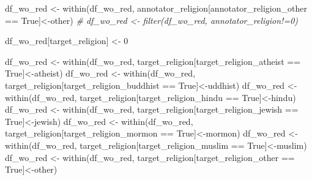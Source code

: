\documentclass[
]{article}
\newenvironment{Shaded}{\begin{snugshade}}{\end{snugshade}}
\newcommand{\CommentTok}[1]{\textcolor[rgb]{0.56,0.35,0.01}{\textit{#1}}}
\newcommand{\DecValTok}[1]{\textcolor[rgb]{0.00,0.00,0.81}{#1}}
\newcommand{\FunctionTok}[1]{\textcolor[rgb]{0.00,0.00,0.00}{#1}}
\newcommand{\NormalTok}[1]{#1}
\newcommand{\OtherTok}[1]{\textcolor[rgb]{0.56,0.35,0.01}{#1}}
\newcommand{\SpecialCharTok}[1]{\textcolor[rgb]{0.00,0.00,0.00}{#1}}
\newcommand{\StringTok}[1]{\textcolor[rgb]{0.31,0.60,0.02}{#1}}
\begin{document}
\begin{Shaded}
\begin{Highlighting}[]
\NormalTok{df\_wo\_red }\OtherTok{\textless{}{-}} \FunctionTok{within}\NormalTok{(df\_wo\_red, annotator\_religion[annotator\_religion\_other }\SpecialCharTok{==} \StringTok{\textquotesingle{}True\textquotesingle{}}\NormalTok{]}\OtherTok{\textless{}{-}}\StringTok{\textquotesingle{}other\textquotesingle{}}\NormalTok{)}
\CommentTok{\# df\_wo\_red \textless{}{-} filter(df\_wo\_red, annotator\_religion!=0)}


\NormalTok{df\_wo\_red[}\StringTok{\textquotesingle{}target\_religion\textquotesingle{}}\NormalTok{] }\OtherTok{\textless{}{-}} \DecValTok{0}
                       
\NormalTok{df\_wo\_red }\OtherTok{\textless{}{-}} \FunctionTok{within}\NormalTok{(df\_wo\_red, target\_religion[target\_religion\_atheist }\SpecialCharTok{==} \StringTok{\textquotesingle{}True\textquotesingle{}}\NormalTok{]}\OtherTok{\textless{}{-}}\StringTok{\textquotesingle{}atheist\textquotesingle{}}\NormalTok{)}
\NormalTok{df\_wo\_red }\OtherTok{\textless{}{-}} \FunctionTok{within}\NormalTok{(df\_wo\_red, target\_religion[target\_religion\_buddhist }\SpecialCharTok{==} \StringTok{\textquotesingle{}True\textquotesingle{}}\NormalTok{]}\OtherTok{\textless{}{-}}\StringTok{\textquotesingle{}uddhist\textquotesingle{}}\NormalTok{)}
\NormalTok{df\_wo\_red }\OtherTok{\textless{}{-}} \FunctionTok{within}\NormalTok{(df\_wo\_red, target\_religion[target\_religion\_hindu }\SpecialCharTok{==} \StringTok{\textquotesingle{}True\textquotesingle{}}\NormalTok{]}\OtherTok{\textless{}{-}}\StringTok{\textquotesingle{}hindu\textquotesingle{}}\NormalTok{)}
\NormalTok{df\_wo\_red }\OtherTok{\textless{}{-}} \FunctionTok{within}\NormalTok{(df\_wo\_red, target\_religion[target\_religion\_jewish }\SpecialCharTok{==} \StringTok{\textquotesingle{}True\textquotesingle{}}\NormalTok{]}\OtherTok{\textless{}{-}}\StringTok{\textquotesingle{}jewish\textquotesingle{}}\NormalTok{)}
\NormalTok{df\_wo\_red }\OtherTok{\textless{}{-}} \FunctionTok{within}\NormalTok{(df\_wo\_red, target\_religion[target\_religion\_mormon }\SpecialCharTok{==} \StringTok{\textquotesingle{}True\textquotesingle{}}\NormalTok{]}\OtherTok{\textless{}{-}}\StringTok{\textquotesingle{}mormon\textquotesingle{}}\NormalTok{)}
\NormalTok{df\_wo\_red }\OtherTok{\textless{}{-}} \FunctionTok{within}\NormalTok{(df\_wo\_red, target\_religion[target\_religion\_muslim }\SpecialCharTok{==} \StringTok{\textquotesingle{}True\textquotesingle{}}\NormalTok{]}\OtherTok{\textless{}{-}}\StringTok{\textquotesingle{}muslim\textquotesingle{}}\NormalTok{)}
\NormalTok{df\_wo\_red }\OtherTok{\textless{}{-}} \FunctionTok{within}\NormalTok{(df\_wo\_red, target\_religion[target\_religion\_other }\SpecialCharTok{==} \StringTok{\textquotesingle{}True\textquotesingle{}}\NormalTok{]}\OtherTok{\textless{}{-}}\StringTok{\textquotesingle{}other\textquotesingle{}}\NormalTok{)}


\end{Highlighting}
\end{Shaded}
\end{document}
